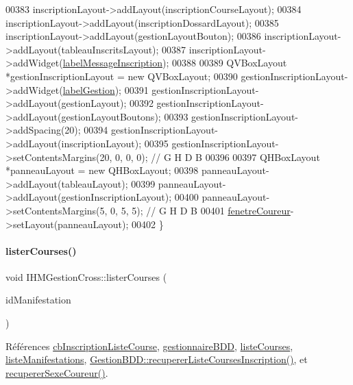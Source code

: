 \begin{DoxyCode}
00383     inscriptionLayout->addLayout(inscriptionCourseLayout);
00384     inscriptionLayout->addLayout(inscriptionDossardLayout);
00385     inscriptionLayout->addLayout(gestionLayoutBouton);
00386     inscriptionLayout->addLayout(tableauInscritsLayout);
00387     inscriptionLayout->addWidget(\hyperlink{class_i_h_m_gestion_cross_a1855bd63290c39c20660064b41710e8c}{labelMessageInscription});
00388 
00389     QVBoxLayout *gestionInscriptionLayout = \textcolor{keyword}{new} QVBoxLayout;
00390     gestionInscriptionLayout->addWidget(\hyperlink{class_i_h_m_gestion_cross_abfb2504c2d5189d08e24677e04ddf3ba}{labelGestion});
00391     gestionInscriptionLayout->addLayout(gestionLayout);
00392     gestionInscriptionLayout->addLayout(gestionLayoutBoutons);
00393     gestionInscriptionLayout->addSpacing(20);
00394     gestionInscriptionLayout->addLayout(inscriptionLayout);
00395     gestionInscriptionLayout->setContentsMargins(20, 0, 0, 0); \textcolor{comment}{// G H D B}
00396 
00397     QHBoxLayout *panneauLayout = \textcolor{keyword}{new} QHBoxLayout;
00398     panneauLayout->addLayout(tableauLayout);
00399     panneauLayout->addLayout(gestionInscriptionLayout);
00400     panneauLayout->setContentsMargins(5, 0, 5, 5); \textcolor{comment}{// G H D B}
00401     \hyperlink{class_i_h_m_gestion_cross_aa776ee3d04b5e02414e4f97ace344c0c}{fenetreCoureur}->setLayout(panneauLayout);
00402 \}
\end{DoxyCode}
\mbox{\label{class_i_h_m_gestion_cross_a34567afe3e94862ebd9af51528dedb65}} 
\paragraph{\texorpdfstring{lister\+Courses()}{listerCourses()}}
{\footnotesize\ttfamily void I\+H\+M\+Gestion\+Cross\+::lister\+Courses (\begin{DoxyParamCaption}\item[{Q\+String}]{id\+Manifestation }\end{DoxyParamCaption})\hspace{0.3cm}{\ttfamily [private]}}



Références \hyperlink{class_i_h_m_gestion_cross_aff44e6f1a225ee5b55783afe72049f83}{cb\+Inscription\+Liste\+Course}, \hyperlink{class_i_h_m_gestion_cross_a440bac63a3e51db3e2c08e883f8cafc9}{gestionnaire\+B\+DD}, \hyperlink{class_i_h_m_gestion_cross_a66fc14c0ed874e72b6ada34e9b83603a}{liste\+Courses}, \hyperlink{class_i_h_m_gestion_cross_ac42ca910fa9802b3f63e3393aaa14e8a}{liste\+Manifestations}, \hyperlink{class_gestion_b_d_d_a59ef29e28993c64aa4d5a8c42a8fb08d}{Gestion\+B\+D\+D\+::recuperer\+Liste\+Courses\+Inscription()}, et \hyperlink{class_i_h_m_gestion_cross_a7e1cdc8b3b01f2f2f666f80bf1cc9f5a}{recuperer\+Sexe\+Coureur()}.




